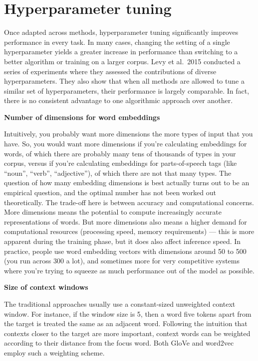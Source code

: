 \documentclass[]{krantz}
\begin{document}
\hypertarget{hyperparameter-tuning}{%
\section{Hyperparameter tuning}\label{hyperparameter-tuning}}

Once adapted across methods, hyperparameter tuning significantly improves performance in every task. In many cases, changing the setting of a single hyperparameter yields a greater increase in performance than switching to a better algorithm or training on a larger corpus. Levy et al.~2015 conducted a series of experiments where they assessed the contributions of diverse hyperparameters. They also show that when all methods are allowed to tune a similar set of hyperparameters, their performance is largely comparable. In fact, there is no consistent advantage to one algorithmic approach over another.

\textbf{Number of dimensions for word embeddings}

Intuitively, you probably want more dimensions the more types of input that you have. So, you would want more dimensions if you're calculating embeddings for words, of which there are probably many tens of thousands of types in your corpus, versus if you're calculating embeddings for parts-of-speech tags (like ``noun'', ``verb'', ``adjective''), of which there are not that many types. The question of how many embedding dimensions is best actually turns out to be an empirical question, and the optimal number has not been worked out theoretically. The trade-off here is between accuracy and computational concerns.
More dimensions means the potential to compute increasingly accurate representations of words. But more dimensions also means a higher demand for computational resources (processing speed, memory requirements) --- this is more apparent during the training phase, but it does also affect inference speed.
In practice, people use word embedding vectors with dimensions around 50 to 500 (you run across 300 a lot), and sometimes more for very competitive systems where you're trying to squeeze as much performance out of the model as possible.

\textbf{Size of context windows}

The traditional approaches usually use a constant-sized unweighted context window. For instance, if the window size is 5, then a word five tokens apart from the target is treated the same as an adjacent word. Following the intuition that contexts closer to the target are more important, context words can be weighted according to their distance from the focus word. Both GloVe and word2vec employ such a weighting scheme.
\end{document}
